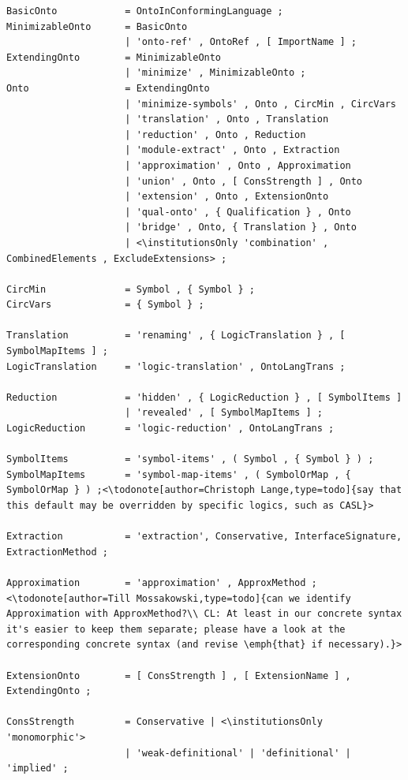 \documentclass[10pt,%
\ifpretendfinal
final%
\else
draft%
\fi,
]{scrreprt}
\makeatletter
\newcommand*\CommentAuthor{}
\renewcommand*\CommentAuthor{#1}}
\newcommand*\CommentDate{}
\renewcommand*\CommentDate{#1}}
\newcommand*\CommentId{}
\renewcommand*\CommentId{#1}}
\newcommand*\CommentType{}
\renewcommand*\CommentType{#1}}
\newcommand*{\SetCommentColorByType}[1]{%
\edef\localType{{#1}}%
\expandafter\ifstrequal\localType{q-aut}{\colorlet{CommentColor}{red}}{%
\expandafter\ifstrequal\localType{q-all}{\colorlet{CommentColor}{orange}}{%
\expandafter\ifstrequal\localType{todo}{\colorlet{CommentColor}{orange}}{%
\expandafter\ifstrequal\localType{fyi}{\colorlet{CommentColor}{lightgray}}{%
\colorlet{CommentColor}{yellow}}}}}}
\newcommand*{\SetCommentPrefixByType}[1]{%
\edef\localType{{#1}}%
\expandafter\@ifmtarg\localType{%
\edef\CommentPrefix{}%
}{%
\caseupper[q]{#1}%
\edef\CommentPrefix{\thestring: }%
}}
\newcommand*{\initComment}[1]{%
\setkeys{Comment}{#1}%
\SetCommentColorByType{\CommentType}%
\relax%
\SetCommentPrefixByType{\CommentType}%
\relax%
}
\newcommand*{\todonote}[2][]{%
\initComment{#1}%
\pdfcomment[author=\CommentAuthor,color=CommentColor,date=\CommentDate,id=\CommentId]{%
\CommentPrefix
#2}}
\renewcommand*{\todonote}[2][]{%
\initComment{#1}%
\ednote{\CommentPrefix #2}}
\newcommand*{\institutionsOnly}{\bfseries\itshape}
\makeatother
\begin{document}
\begin{lstlisting}[language=ebnf,escapeinside={<>}]
BasicOnto            = OntoInConformingLanguage ;
MinimizableOnto      = BasicOnto
                     | 'onto-ref' , OntoRef , [ ImportName ] ;
ExtendingOnto        = MinimizableOnto
                     | 'minimize' , MinimizableOnto ;
Onto                 = ExtendingOnto
                     | 'minimize-symbols' , Onto , CircMin , CircVars
                     | 'translation' , Onto , Translation
                     | 'reduction' , Onto , Reduction
                     | 'module-extract' , Onto , Extraction 
                     | 'approximation' , Onto , Approximation
                     | 'union' , Onto , [ ConsStrength ] , Onto 
                     | 'extension' , Onto , ExtensionOnto
                     | 'qual-onto' , { Qualification } , Onto
                     | 'bridge' , Onto, { Translation } , Onto
                     | <\institutionsOnly 'combination' , CombinedElements , ExcludeExtensions> ;

CircMin              = Symbol , { Symbol } ;
CircVars             = { Symbol } ;

Translation          = 'renaming' , { LogicTranslation } , [ SymbolMapItems ] ;
LogicTranslation     = 'logic-translation' , OntoLangTrans ;

Reduction            = 'hidden' , { LogicReduction } , [ SymbolItems ]
                     | 'revealed' , [ SymbolMapItems ] ;
LogicReduction       = 'logic-reduction' , OntoLangTrans ;

SymbolItems          = 'symbol-items' , ( Symbol , { Symbol } ) ;
SymbolMapItems       = 'symbol-map-items' , ( SymbolOrMap , { SymbolOrMap } ) ;<\todonote[author=Christoph Lange,type=todo]{say that this default may be overridden by specific logics, such as CASL}>

Extraction           = 'extraction', Conservative, InterfaceSignature, ExtractionMethod ;

Approximation        = 'approximation' , ApproxMethod ;<\todonote[author=Till Mossakowski,type=todo]{can we identify Approximation with ApproxMethod?\\ CL: At least in our concrete syntax it's easier to keep them separate; please have a look at the corresponding concrete syntax (and revise \emph{that} if necessary).}>

ExtensionOnto        = [ ConsStrength ] , [ ExtensionName ] , ExtendingOnto ;

ConsStrength         = Conservative | <\institutionsOnly 'monomorphic'>
                     | 'weak-definitional' | 'definitional' | 'implied' ;


\end{lstlisting}
\end{document}
